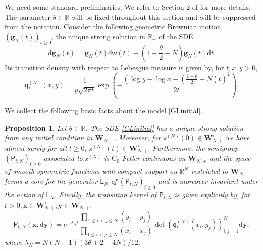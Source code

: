 \documentclass[]{article}
\newtheorem{prop}[thm]{Proposition}
\begin{document}
We need some standard preliminaries. We refer to Section 2 of \cite{AM24} for more details. The parameter $\theta \in \mathbb{R}$ will be fixed throughout this section and will be suppressed from the notation. Consider the following geometric Brownian motion $(\boldsymbol{g}_N(t))_{t\ge 0}$, the unique strong solution in $\mathbb{R}_+$ of the SDE
\begin{equation}\label{SDEgeomBM}
\mathrm{d}\boldsymbol{g}_N(t)=\boldsymbol{g}_N(t)\mathrm{d}\mathsf{w}(t)+\left(1+\frac{\theta}{2}-N\right)\boldsymbol{g}_N(t)\mathrm{d}t.
\end{equation}
Its transition  density with respect to Lebesgue measure is given by, for $t,x,y >0$,
\begin{equation}\label{GeomBMtransKernel}
\mathsf{q}_t^{(N)}(x,y)=\frac{1}{y\sqrt{2\pi t}} \exp\left(-\frac{\left(\log y-\log x-\left(\frac{1+\theta}{2}-N\right)t\right)^2}{2t}\right).
\end{equation}

We collect the following basic facts about the model \eqref{GLinitial}.

\begin{prop}\label{PropFiniteDimProperties}
Let $\theta \in \mathbb{R}$. The SDE \eqref{GLinitial} has a unique strong solution  from any initial condition in $\mathbf{W}_{N;+}$. Moreover, for $\mathsf{x}^{(N)}(0)\in \mathbf{W}_{N;+}^\circ$ we have almost surely for all $t\ge 0$, $\mathsf{x}^{(N)}(t)\in \mathbf{W}_{N;+}^\circ$. Furthermore, the semigroup $(\mathsf{P}_{t;N})_{t\ge0}$ associated to $\mathsf{x}^{(N)}$ is $\mathrm{C}_0$-Feller continuous on $\mathbf{W}_{N;+}$ and the space of smooth symmetric  functions with compact support on $\mathbb{R}^N$ restricted to $\mathbf{W}_{N;+}$ forms a core for the generator $\mathsf{L}_N$ of $(\mathsf{P}_{t;N})_{t\ge0}$ and is moreover invariant under the action of $\mathsf{L}_N$. Finally, the transition kernel of $\mathsf{P}_{t;N}$ is given explicitly by, for $t>0, \mathbf{x}\in \mathbf{W}_{N;+}^\circ, \mathbf{y}\in \mathbf{W}_{N;+}$,
\begin{equation}\label{TransitionKernel}
\mathsf{P}_{t;N}(\mathbf{x},\mathrm{d}\mathbf{y})=\mathrm{e}^{-\lambda_Nt}\frac{\prod_{1\le i <j \le N}(y_i-y_j)}{\prod_{1\le i <j \le N}(x_i-x_j)}\det\left(\mathsf{q}_t^{(N)}(x_i,y_j)\right)_{i,j=1}^N\mathrm{d}\mathbf{y},
\end{equation}
where $\lambda_N=N(N-1)(3\theta+2-4N)/12$.
\end{prop}
\end{document}
